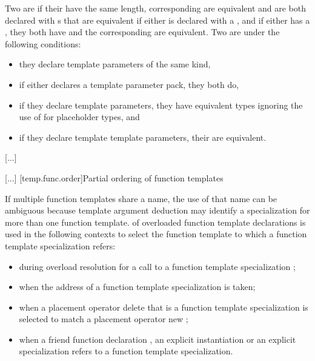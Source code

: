 \documentclass{wg21}
\begin{document}
\pnum
Two  are
 if
their  have the same length,
corresponding  are equivalent
and are both declared with s that are equivalent
if either 
is declared with a ,
and if either  has a ,
they both have
 and the corresponding
 are equivalent.
Two  are
under the following conditions:
\begin{itemize}
    \item they declare template parameters of the same kind,
    \item if either declares a template parameter pack, they both do,
    \item if they declare  template parameters,
    they have equivalent types
    ignoring the use of  for placeholder types, and
    \item if they declare template template parameters, their  are equivalent.
\end{itemize}
\textcolor{noteclr}{[...]}

\textcolor{noteclr}{[...]}
[temp.func.order]{Partial ordering of function templates}

\pnum
{}%
%
If multiple function templates share a name,
the use of that name can be ambiguous because
template argument deduction  may identify
a specialization for more than one function template.
of overloaded function template declarations is used in the following contexts
to select the function template to which a function template specialization
refers:
\begin{itemize}
    \item
    during overload resolution for a call to a function template specialization ;
    \item
    when the address of a function template specialization is taken;
    \item
    when a placement operator delete that is a
    function template
    specialization
    is selected to match a placement operator new
    ;
    \item
    when a friend function declaration , an
    explicit instantiation  or an explicit specialization  refers to
    a function template specialization.
\end{itemize}
\end{document}
